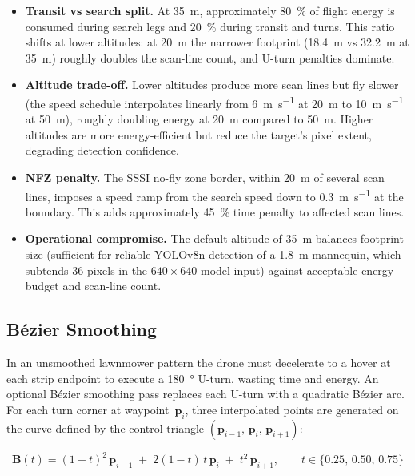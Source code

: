 \begin{itemize}
  \item \textbf{Transit vs search split.} At \SI{35}{\metre}, approximately \SI{80}{\percent} of flight energy is consumed during search legs and \SI{20}{\percent} during transit and turns. This ratio shifts at lower altitudes: at \SI{20}{\metre} the narrower footprint (\SI{18.4}{\metre} vs \SI{32.2}{\metre} at \SI{35}{\metre}) roughly doubles the scan-line count, and U-turn penalties dominate.
  \item \textbf{Altitude trade-off.} Lower altitudes produce more scan lines but fly slower (the speed schedule interpolates linearly from \SI{6}{\metre\per\second} at \SI{20}{\metre} to \SI{10}{\metre\per\second} at \SI{50}{\metre}), roughly doubling energy at \SI{20}{\metre} compared to \SI{50}{\metre}. Higher altitudes are more energy-efficient but reduce the target's pixel extent, degrading detection confidence.
  \item \textbf{NFZ penalty.} The SSSI no-fly zone border, within \SI{20}{\metre} of several scan lines, imposes a speed ramp from the search speed down to \SI{0.3}{\metre\per\second} at the boundary. This adds approximately \SI{45}{\percent} time penalty to affected scan lines.
  \item \textbf{Operational compromise.} The default altitude of \SI{35}{\metre} balances footprint size (sufficient for reliable YOLOv8n detection of a \SI{1.8}{\metre} mannequin, which subtends 36 pixels in the $640\!\times\!640$ model input) against acceptable energy budget and scan-line count.
\end{itemize}

\subsection{B\'{e}zier Smoothing}\label{sec:bezier}

In an unsmoothed lawnmower pattern the drone must decelerate to a hover at each strip endpoint to execute a \SI{180}{\degree} U-turn, wasting time and energy. An optional B\'{e}zier smoothing pass replaces each U-turn with a quadratic B\'{e}zier arc. For each turn corner at waypoint~$\mathbf{p}_i$, three interpolated points are generated on the curve defined by the control triangle $(\mathbf{p}_{i-1},\, \mathbf{p}_i,\, \mathbf{p}_{i+1})$:

\begin{equation}\label{eq:bezier}
  \mathbf{B}(t) = (1-t)^2\,\mathbf{p}_{i-1} \;+\; 2(1-t)\,t\,\mathbf{p}_i \;+\; t^2\,\mathbf{p}_{i+1}, \qquad t \in \{0.25,\, 0.50,\, 0.75\}
\end{equation}

